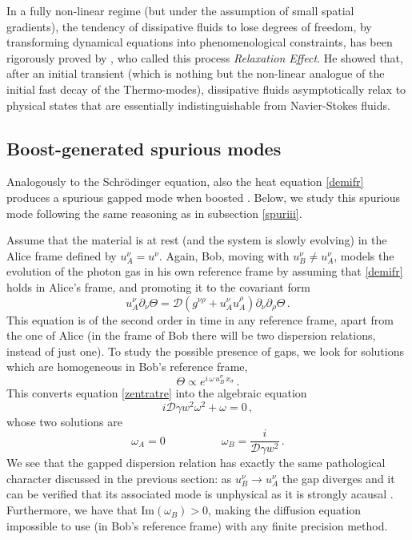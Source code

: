 \documentclass[a4paper, amsfonts, amssymb, amsmath, reprint, twocolumn, showkeys, nofootinbib]{revtex4-2}
\begin{document}
In a fully non-linear regime (but under the assumption of small spatial gradients), the tendency of dissipative fluids to lose degrees of freedom, by transforming dynamical equations into phenomenological constraints, has been rigorously proved by \citet{LindblomRelaxation1996}, who called this process \textit{Relaxation Effect}. He showed that, after an initial transient (which is nothing but the non-linear analogue of the initial fast decay of the Thermo-modes), dissipative fluids asymptotically relax to physical states that are essentially indistinguishable from Navier-Stokes fluids.

\subsection{Boost-generated spurious modes}\label{ilsuccodelproblema}

Analogously to the Schr\"{o}dinger equation, also the heat equation \eqref{demifr} produces a spurious gapped mode when boosted \citep{Kost2000}. Below, we study this spurious mode following the same reasoning as in subsection \ref{spuriii}. 

Assume that the material is at rest (and the system is slowly evolving) in the Alice frame defined by $u_A^\nu=u^\nu$. Again, Bob, moving with $u_B^\nu \neq u_A^\nu$, models the evolution of the photon gas in his own reference frame by assuming  that   \eqref{demifr} holds in Alice's frame, and promoting it to the covariant form
\begin{equation}\label{zentratre}
u_A^\nu \partial_\nu \Theta = \mathcal{D} (g^{\nu \rho} + u_A^\nu u_A^\rho) \partial_\nu \partial_\rho \Theta \, .
\end{equation}
This equation is of the second order in time in any reference frame, apart from the one of Alice (in the frame of Bob there will be two dispersion relations, instead of just one). To study the possible presence of gaps, we look for solutions which are homogeneous in Bob's reference frame,
\begin{equation}
\Theta \propto e^{i \,\omega  \,u_B^\sigma  \,x_\sigma} \, .
\end{equation} 
This converts equation \eqref{zentratre} into the algebraic equation
\begin{equation}
i \mathcal{D} \gamma w^2 \omega^2 + \omega =0 \, ,
\end{equation}
whose two solutions are
\begin{equation}
\omega_A =0   \qquad \qquad \quad   
\omega_B = \dfrac{i}{\mathcal{D} \gamma w^2} \, .
\end{equation}
We see that the gapped dispersion relation has exactly the same pathological character discussed in the previous section: as $u_B^\nu \rightarrow u_A^\nu$ the gap diverges and it can be verified that its associated mode is unphysical as it is strongly acausal \cite{GavassinoLyapunov_2020}. 
Furthermore, we have that $\text{Im}(\omega_B)>0$, making the diffusion equation impossible to use (in Bob's reference frame) with any finite precision method. 
\end{document}
